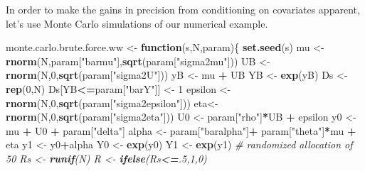\documentclass[]{book}
\newenvironment{Shaded}{\begin{snugshade}}{\end{snugshade}}
\newcommand{\CommentTok}[1]{\textcolor[rgb]{0.56,0.35,0.01}{\textit{#1}}}
\newcommand{\ControlFlowTok}[1]{\textcolor[rgb]{0.13,0.29,0.53}{\textbf{#1}}}
\newcommand{\DecValTok}[1]{\textcolor[rgb]{0.00,0.00,0.81}{#1}}
\newcommand{\KeywordTok}[1]{\textcolor[rgb]{0.13,0.29,0.53}{\textbf{#1}}}
\newcommand{\NormalTok}[1]{#1}
\newcommand{\OperatorTok}[1]{\textcolor[rgb]{0.81,0.36,0.00}{\textbf{#1}}}
\newcommand{\StringTok}[1]{\textcolor[rgb]{0.31,0.60,0.02}{#1}}
\theoremstyle{definition}
\theoremstyle{definition}
\theoremstyle{definition}
\theoremstyle{remark}
\let\BeginKnitrBlock\begin \let\EndKnitrBlock\end
\begin{document}
\BeginKnitrBlock{example}
\protect\hypertarget{exm:unnamed-chunk-74}{}{\label{exm:unnamed-chunk-74} }In order to make the gains in precision from conditioning on covariates apparent, let's use Monte Carlo simulations of our numerical example.
\EndKnitrBlock{example}

\begin{Shaded}
\begin{Highlighting}[]
\NormalTok{monte.carlo.brute.force.ww <-}\StringTok{ }\ControlFlowTok{function}\NormalTok{(s,N,param)\{}
  \KeywordTok{set.seed}\NormalTok{(s)}
\NormalTok{  mu <-}\StringTok{ }\KeywordTok{rnorm}\NormalTok{(N,param[}\StringTok{"barmu"}\NormalTok{],}\KeywordTok{sqrt}\NormalTok{(param[}\StringTok{"sigma2mu"}\NormalTok{]))}
\NormalTok{  UB <-}\StringTok{ }\KeywordTok{rnorm}\NormalTok{(N,}\DecValTok{0}\NormalTok{,}\KeywordTok{sqrt}\NormalTok{(param[}\StringTok{"sigma2U"}\NormalTok{]))}
\NormalTok{  yB <-}\StringTok{ }\NormalTok{mu }\OperatorTok{+}\StringTok{ }\NormalTok{UB }
\NormalTok{  YB <-}\StringTok{ }\KeywordTok{exp}\NormalTok{(yB)}
\NormalTok{  Ds <-}\StringTok{ }\KeywordTok{rep}\NormalTok{(}\DecValTok{0}\NormalTok{,N)}
\NormalTok{  Ds[YB}\OperatorTok{<=}\NormalTok{param[}\StringTok{"barY"}\NormalTok{]] <-}\StringTok{ }\DecValTok{1} 
\NormalTok{  epsilon <-}\StringTok{ }\KeywordTok{rnorm}\NormalTok{(N,}\DecValTok{0}\NormalTok{,}\KeywordTok{sqrt}\NormalTok{(param[}\StringTok{"sigma2epsilon"}\NormalTok{]))}
\NormalTok{  eta<-}\StringTok{ }\KeywordTok{rnorm}\NormalTok{(N,}\DecValTok{0}\NormalTok{,}\KeywordTok{sqrt}\NormalTok{(param[}\StringTok{"sigma2eta"}\NormalTok{]))}
\NormalTok{  U0 <-}\StringTok{ }\NormalTok{param[}\StringTok{"rho"}\NormalTok{]}\OperatorTok{*}\NormalTok{UB }\OperatorTok{+}\StringTok{ }\NormalTok{epsilon}
\NormalTok{  y0 <-}\StringTok{ }\NormalTok{mu }\OperatorTok{+}\StringTok{  }\NormalTok{U0 }\OperatorTok{+}\StringTok{ }\NormalTok{param[}\StringTok{"delta"}\NormalTok{]}
\NormalTok{  alpha <-}\StringTok{ }\NormalTok{param[}\StringTok{"baralpha"}\NormalTok{]}\OperatorTok{+}\StringTok{  }\NormalTok{param[}\StringTok{"theta"}\NormalTok{]}\OperatorTok{*}\NormalTok{mu }\OperatorTok{+}\StringTok{ }\NormalTok{eta}
\NormalTok{  y1 <-}\StringTok{ }\NormalTok{y0}\OperatorTok{+}\NormalTok{alpha}
\NormalTok{  Y0 <-}\StringTok{ }\KeywordTok{exp}\NormalTok{(y0)}
\NormalTok{  Y1 <-}\StringTok{ }\KeywordTok{exp}\NormalTok{(y1)}
  \CommentTok{# randomized allocation of 50% of individuals}
\NormalTok{  Rs <-}\StringTok{ }\KeywordTok{runif}\NormalTok{(N)}
\NormalTok{  R <-}\StringTok{ }\KeywordTok{ifelse}\NormalTok{(Rs}\OperatorTok{<=}\NormalTok{.}\DecValTok{5}\NormalTok{,}\DecValTok{1}\NormalTok{,}\DecValTok{0}\NormalTok{)}
}
\end{Highlighting}
\end{Shaded}
\end{document}
